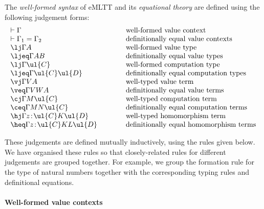 \begin{definition}
\label{def:judgements}
The \emph{well-formed syntax} of eMLTT and its \emph{equational theory} are defined using the following judgement forms:
\[
\begin{array}{l @{\qquad\qquad}l}
\index{context!value --!well-formed --}
\vdash \Gamma & \text{well-formed value context}
\\
\vdash \Gamma_1 = \Gamma_2 & \text{definitionally equal value contexts}
\\
\index{type!value --!well-formed --}
\lj \Gamma A & \text{well-formed value type}
\\
\ljeq \Gamma A B & \text{definitionally equal value types}
\\
\index{type!computation --!well-formed --}
\lj \Gamma \ul{C} & \text{well-formed computation type}
\\
\ljeq \Gamma {\ul{C}} {\ul{D}} & \text{definitionally equal computation types}
\\
\index{term!value --!well-typed --}
\vj \Gamma V A & \text{well-typed value term}
\\
\veq \Gamma V W A & \text{definitionally equal value terms}
\\
\index{term!computation --!well-typed --}
\cj \Gamma M \ul{C} & \text{well-typed computation term}
\\
\ceq \Gamma M N \ul{C} & \text{definitionally equal computation terms}
\\
\index{term!homomorphism --!well-typed --}
\hj \Gamma {z \!:\! \ul{C}} K \ul{D} & \text{well-typed homomorphism term}
\\
\heq \Gamma {z \!:\! \ul{C}} K L \ul{D} & \text{definitionally equal homomorphism terms}
\end{array}
\]
\end{definition}
\vspace{0.2cm}

\noindent 
These judgements are defined mutually inductively, using the rules given below.
We have organised these rules so that closely-related rules for different judgements are grouped together. For example, we group the formation rule for the type of natural numbers together with the corresponding typing rules and definitional equations.

\paragraph*{Well-formed value contexts} \mbox{}

